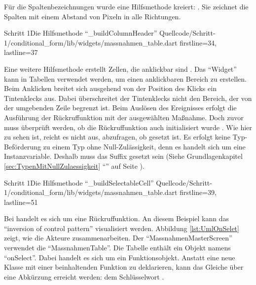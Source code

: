   Für die Spaltenbezeichnungen wurde eine Hilfsmethode kreiert:  \Lst{\ref{lst:Schritt1buildColumnHeader}}.
  Sie zeichnet die Spalten mit einem Abstand von  Pixeln in alle Richtungen.

  \begin{alexlisting}{Schritt 1}{Die Hilfsmethode \enquote{_buildColumnHeader}}
    {Quellcode/Schritt-1/conditional_form/lib/widgets/massnahmen_table.dart}
    {firstline=34, lastline=37}
    \label{lst:Schritt1buildColumnHeader}
  \end{alexlisting}

  Eine weitere Hilfsmethode  erstellt Zellen, die anklickbar sind \Lst{\ref{lst:Schritt1buildSelectableCell}}.
  Das \enquote{Widget}   kann in Tabellen verwendet werden, um einen anklickbaren Bereich zu erstellen.
  Beim  Anklicken breitet sich ausgehend von der Position des Klicks ein Tintenklecks  aus.
  Dabei überschreitet der Tintenklecks nicht den Bereich, der von der umgebenden Zeile begrenzt ist.
  Beim Auslösen des Ereignisses  erfolgt die Ausführung der Rückruffunktion   mit der ausgewählten Maßnahme.
  Doch zuvor muss überprüft werden,
  ob die Rückruffunktion auch initialisiert wurde .
  Wie hier zu sehen ist, reicht es nicht aus, abzufragen, ob   gesetzt ist.
  Es erfolgt keine Typ-Beförderung zu einem Typ ohne Null-Zulässigkeit, denn es handelt sich um eine Instanzvariable.
  Deshalb muss das Suffix \IC{!} gesetzt sein  (Siehe Grundlagenkapitel \ref{sec:TypenMitNullZulaessigkeit} \enquote{} auf Seite \pageref{sec:TypenMitNullZulaessigkeit}).
  
  \begin{alexlisting}{Schritt 1}{Die Hilfsmethode \enquote{_buildSelectableCell}}
    {Quellcode/Schritt-1/conditional_form/lib/widgets/massnahmen_table.dart}
    {firstline=39, lastline=51}
    \label{lst:Schritt1buildSelectableCell}
  \end{alexlisting}

  \clearpage
  Bei  handelt es sich um eine Rückruffunktion.
  An diesem Beispiel kann das \enquote{inversion of control pattern} visualisiert werden.
  Abbildung \ref{lst:UmlOnSelet} zeigt, wie die Akteure zusammenarbeiten.
  Der \enquote{MassnahmenMasterScreen} verwendet die \enquote{MassnahmenTable}.
  Die Tabelle enthält ein Objekt namens \enquote{onSelect}.
  Dabei handelt es sich um ein Funktionsobjekt.
  Anstatt eine neue Klasse mit einer beinhaltenden Funktion zu deklarieren, kann das Gleiche über eine Abkürzung erreicht werden:
  dem Schlüsselwort  \Lst{\ref{lst:Schritt1TypedefOnSelectCallback}}.
  
